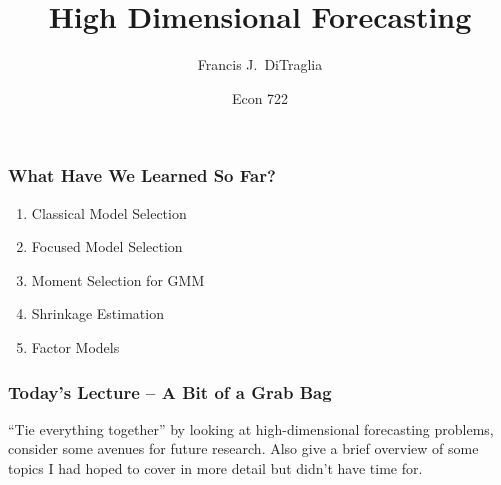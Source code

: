 \documentclass[handout]{beamer}
\title[Econ 722]{High Dimensional Forecasting}
\author[F. DiTraglia]{Francis J.\ DiTraglia}
\institute{University of Pennsylvania}
\date{Econ 722}
\begin{document}
 



\begin{frame}[plain]
	\titlepage 
	

\end{frame} 
\begin{frame}[c]\frametitle{What Have We Learned So Far?}
    
    \begin{enumerate}
    	\item Classical Model Selection
    	\item Focused Model Selection
    	\item Moment Selection for GMM
    	\item Shrinkage Estimation
    	\item Factor Models
    \end{enumerate}

\end{frame}
\begin{frame}[c]\frametitle{Today's Lecture -- A Bit of a Grab Bag}
    
``Tie everything together'' by looking at high-dimensional forecasting problems, consider some avenues for future research. Also give a brief overview of some topics I had hoped to cover in more detail but didn't have time for.

\end{frame}
\end{document}
